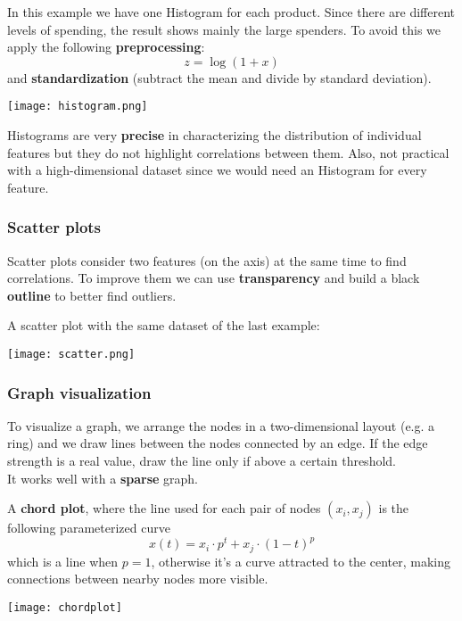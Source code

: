 \begin{example}
	In this example we have one Histogram for each product. Since there are different levels of spending, the result shows mainly the large spenders. To avoid this we apply the following \textbf{preprocessing}:
	\begin{equation*}
		z = \log(1+x)
	\end{equation*}
	and \textbf{standardization} (subtract the mean and divide by standard deviation).
	\begin{center}
		\texttt{[image: histogram.png]}
	\end{center}
\end{example}

Histograms are very \textbf{precise} in characterizing the distribution of individual features but they do not highlight correlations between them. Also, not practical with a high-dimensional dataset since we would need an Histogram for every feature.

\subsubsection{Scatter plots}
Scatter plots consider two features (on the axis) at the same time to find correlations. To improve them we can use \textbf{transparency} and build a black \textbf{outline} to better find outliers.

\begin{example}
	A scatter plot with the same dataset of the last example:
	\begin{center}
		\texttt{[image: scatter.png]}
	\end{center}
\end{example}

\subsubsection{Graph visualization}
To visualize a graph, we arrange the nodes in a two-dimensional layout (e.g. a ring) and we draw lines between the nodes connected by an edge. If the edge strength is a real value, draw the line only if above a certain threshold.\\
It works well with a \textbf{sparse} graph.

\newpage
\begin{example}
	A \textbf{chord plot}, where the line used for each pair of nodes $(x_i, x_j)$ is the following parameterized curve
	\begin{equation}
		x(t) = x_i\cdot p^t + x_j\cdot (1-t)^p
	\end{equation}
	which is a line when $p=1$, otherwise it's a curve attracted to the center, making connections between nearby nodes more visible.
	\begin{center}
		\texttt{[image: chordplot]}
	\end{center}
\end{example}

